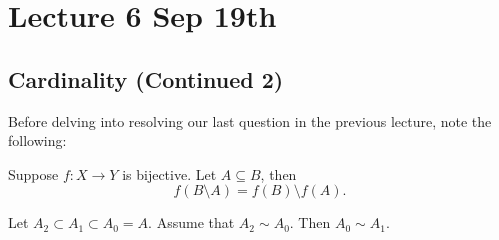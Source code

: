 \documentclass[notoc,notitlepage]{tufte-book}
\begin{document}

\chapter{Lecture 6 Sep 19th}%
\label{chp:lecture_6_sep_19th}

\section{Cardinality (Continued 2)}%
\label{sec:cardinality_continued_2}

Before delving into resolving our last question in the previous lecture, note the following:

\begin{note}
  Suppose $f : X \to Y$ is bijective. Let $A \subseteq B$, then
  \begin{equation*}
    f( B \setminus A ) = f(B) \setminus f(A).
  \end{equation*}
\end{note}

\begin{thm}\label{thm:cantor_schroder_bernstein_theorem}
  Let $A_2 \subset A_1 \subset A_0 = A$. Assume that $A_2 \sim A_0$. Then $A_0 \sim A_1$.
\end{thm}
\end{document}
